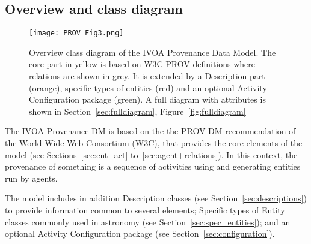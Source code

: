 

\subsection{Overview and class diagram}
\label{sec:overview}



\begin{figure}[hbt]
\centering
\texttt{[image: PROV\_Fig3.png]}
\caption[Overview class diagram of the IVOA Provenance Data Model]{Overview class diagram of the IVOA Provenance Data Model. The core part in yellow is based on W3C PROV definitions where relations are shown in grey. It is extended by a Description part (orange), specific types of entities (red) and an optional Activity Configuration package (green). A full diagram with attributes is shown in Section~\ref{sec:fulldiagram}, Figure~\ref{fig:fulldiagram}}
\label{fig:overview}
\end{figure}

The IVOA Provenance DM is based on the the PROV-DM recommendation \citep{std:W3CProvDM} of the World Wide Web Consortium (W3C), that provides the core elements of the model (see Sections~\ref{sec:ent_act} to~\ref{sec:agent+relations}). 
In this context, the provenance of something is a sequence of activities using and generating entities run by agents.

The model includes in addition Description classes (see Section~\ref{sec:descriptions}) to provide information common to several elements; Specific types of Entity classes commonly used in astronomy (see Section~\ref{sec:spec_entities}); and an optional Activity Configuration package (see Section~\ref{sec:configuration}).

